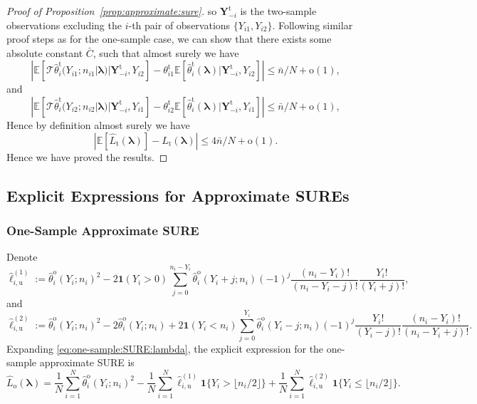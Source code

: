 \documentclass[12pt,letterpaper]{article}
\renewcommand{\u}{\mathrm{u}}
\begin{document}
\begin{proof}[Proof of Proposition~\ref{prop:approximate:sure}]
so $\mathbf{Y}_{-i}^{\mathrm{t}}$ is the two-sample observations excluding the $i$-th pair of observations $\{Y_{i1},Y_{i2}\}$. Following similar proof steps as for the one-sample case, we can show that there exists some absolute constant $\bar{C}$, such that almost surely we have
$$\left|\mathbb{E}\left[\mathcal{T}\hat{\theta}_i^{\mathrm{t}}(Y_{i1};n_{i1}|\boldsymbol{\lambda})|\mathbf{Y}_{-i}^{\mathrm{t}},Y_{i2}\right]-\theta_{i1}^{\mathrm{t}}\mathbb{E}\left[\hat{\theta}_i^{\mathrm{t}}(\boldsymbol{\lambda})|\mathbf{Y}_{-i}^{\mathrm{t}},Y_{i2}\right]\right|\leq\bar{n}/N+\mathrm{o}(1),$$
and 
$$\left|\mathbb{E}\left[\mathcal{T}\hat{\theta}_i^{\mathrm{t}}(Y_{i2};n_{i2}|\boldsymbol{\lambda})|\mathbf{Y}_{-i}^{\mathrm{t}},Y_{i1}\right]-\theta_{i2}^{\mathrm{t}}\mathbb{E}\left[\hat{\theta}_i^{\mathrm{t}}(\boldsymbol{\lambda})|\mathbf{Y}_{-i}^{\mathrm{t}},Y_{i1}\right]\right|\leq\bar{n}/N+\mathrm{o}(1),$$
Hence by definition almost surely we have 
$$\left|\mathbb{E}\left[\hat{L}_{\mathrm{t}}(\boldsymbol{\lambda})\right]-L_{\mathrm{t}}(\boldsymbol{\lambda})\right|\leq4\bar{n}/N+\mathrm{o}(1).$$
Hence we have proved the results.
\end{proof}


\subsection{Explicit Expressions for Approximate SUREs}\label{appendix:explicit:SURE:approx}
\subsubsection{One-Sample Approximate SURE}
Denote
\begin{equation}
  \label{eq:ell_iu_1}
  \hat{\ell}_{i, \u}^{(1)} := \hat{\theta}_i^{\mathrm{o}}(Y_i; n_i)^2 - 2\mathbf{1}(Y_i > 0)\sum_{j=0}^{n_i-Y_i}\hat{\theta}_i^{\mathrm{o}}(Y_i + j; n_i)(-1)^{j}\frac{(n_i-Y_i)!}{(n_i-Y_i-j)!}\frac{Y_i!}{(Y_i+j)!},
\end{equation}
and
\begin{equation}
  \label{eq:ell_iu_2}
  \hat{\ell}_{i, \u}^{(2)} := \hat{\theta}_i^{\mathrm{o}}(Y_i; n_i)^2 - 2 \hat{\theta}_i^{\mathrm{o}}(Y_i; n_i) + 2\mathbf{1}(Y_i < n_i)\sum_{j=0}^{Y_i}\hat{\theta}_i^{\mathrm{o}}(Y_i-j; n_i)(-1)^{j}\frac{Y_i!}{(Y_i-j)!}\frac{(n_i - Y_i)!}{(n_i-Y_i+j)!}.
\end{equation}
Expanding \eqref{eq:one-sample:SURE:lambda}, the explicit expression for the one-sample approximate SURE is 
\begin{equation}\label{eq:SURE:one-sample}
    \hat{L}_{\mathrm{o}}(\boldsymbol{\lambda})=\frac{1}{N}\sum_{i=1}^{N}\hat{\theta}_i^{\mathrm{o}}(Y_{i} ; n_i)^2-\frac{1}{N}\sum_{i=1}^{N}\hat{\ell}_{i, \u}^{(1)}\mathbf{1}\{Y_{i}>\lfloor n_{i}/2\rfloor\}+\frac{1}{N}\sum_{i=1}^{N}\hat{\ell}_{i, \u}^{(2)}\mathbf{1}\{Y_{i}\leq\lfloor n_{i}/2\rfloor\}.
\end{equation}
\end{document}
